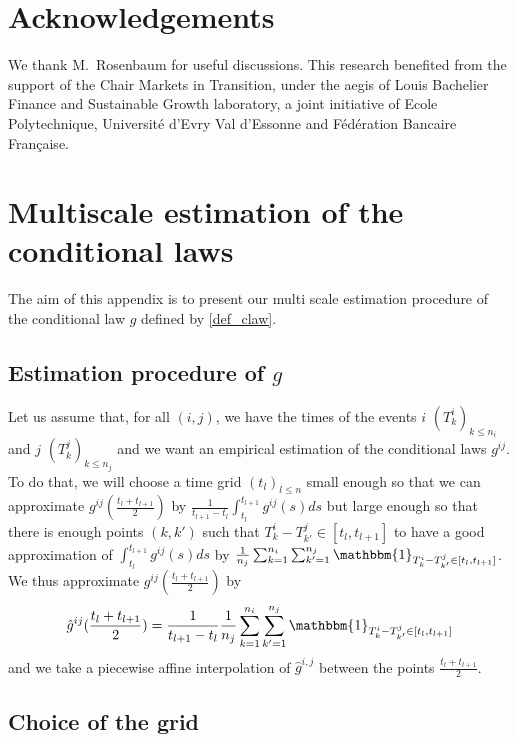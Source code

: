 \documentclass[a4paper,11pt]{article}
\begin{document}

\section*{Acknowledgements}

\noindent 
We thank M.~Rosenbaum for useful discussions.
This research benefited from the support of the Chair Markets in Transition, under the aegis of Louis Bachelier Finance and Sustainable Growth laboratory, a joint initiative of Ecole
Polytechnique, Universit\'e d'Evry Val d'Essonne and F\'ed\'eration Bancaire Fran\c{c}aise.

\appendix
\section{Multiscale estimation of the conditional laws}
\label{app_est}
The aim of this appendix is to present our multi scale estimation procedure of the conditional law $g$ defined by \eqref{def_claw}.

\subsection{Estimation procedure of $g$}

Let us assume that, for all $(i,j)$, we have the times of the events $i$ $(T_k^i)_{k\leq n_i}$ and $j$ $(T_k^j)_{k\leq n_j}$ and we want an empirical estimation of the conditional laws $g^{ij}$.\\

\noindent
To do that, we will choose a time grid $(t_l)_{l\leq n}$ small enough so that we can approximate $g^{ij}(\frac{t_l+t_{l+1}}{2})$ by $\frac{1}{t_{l+1}-t_l}\int_{t_l}^{t_{l+1}} g^{ij}(s)ds$ but large enough so that there is enough points $(k,k')$ such that $T_k^i-T_{k'}^j\in [t_{l},t_{l+1}]$ to have a good approximation of $\int_{t_l}^{t_{l+1}} g^{ij}(s)ds$ by $\frac{1}{n_j} \sum_{k=1}^{n_i} \sum_{k'=1}^{n_j}\mathbbm{1}_{T_k^i-T_{k'}^j\in [t_{l},t_{l+1}]}$. We thus approximate $g^{ij}(\frac{t_l+t_{l+1}}{2})$ by $$\hat{g}^{ij}(\frac{t_l+t_{l+1}}{2})=\frac{1}{t_{l+1}-t_l}\frac{1}{n_j} \sum_{k=1}^{n_i} \sum_{k'=1}^{n_j}\mathbbm{1}_{T_k^i-T_{k'}^j\in [t_{l},t_{l+1}]}$$
and we take a piecewise affine interpolation of $\hat{g}^{i,j}$ between the points $\frac{t_l+t_{l+1}}{2}$.

\subsection{Choice of the grid}
\end{document}

